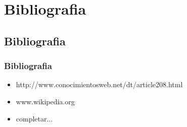 \section{Bibliografia}
\subsection{Bibliografia}
\frame
{
	\frametitle{Bibliografia}
	\begin{itemize}
	\item http://www.conocimientosweb.net/dt/article208.html
	\item www.wikipedia.org
	\item completar...
	\end{itemize}
}
